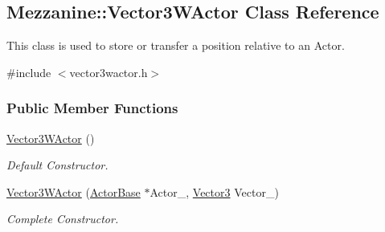 \hypertarget{classMezzanine_1_1Vector3WActor}{
\subsection{Mezzanine::Vector3WActor Class Reference}
\label{classMezzanine_1_1Vector3WActor}
}


This class is used to store or transfer a position relative to an Actor.  




{\ttfamily \#include $<$vector3wactor.h$>$}

\subsubsection*{Public Member Functions}
\begin{DoxyCompactItemize}
\item 
\hyperlink{classMezzanine_1_1Vector3WActor_ad89e8e9ef2abbc97b1111250d75d7420}{Vector3WActor} ()
\begin{DoxyCompactList}\small\item\em Default Constructor. \item\end{DoxyCompactList}\item 
\hyperlink{classMezzanine_1_1Vector3WActor_a354ed14c3d200d22b002ca0722c28c0c}{Vector3WActor} (\hyperlink{classMezzanine_1_1ActorBase}{ActorBase} $\ast$Actor\_\-, \hyperlink{classMezzanine_1_1Vector3}{Vector3} Vector\_\-)
\begin{DoxyCompactList}\small\item\em Complete Constructor. \item\end{DoxyCompactList}\end{DoxyCompactItemize}
